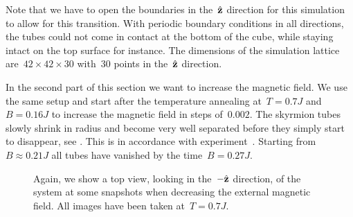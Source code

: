 Note that we have to open the boundaries in the~$\hat{\mathbf{z}}$ direction for this
simulation to allow for this transition. With periodic boundary conditions in
all directions, the tubes could not come in contact at the bottom of the cube,
while staying intact on the top surface for instance. The dimensions of the
simulation lattice are~$42 \times 42 \times 30$ with~$30$ points in the~$\hat{\mathbf{z}}$
direction.

In the second part of this section we want to increase the magnetic field. We
use the same setup and start after the temperature annealing at~$T = 0.7 J$
and~$B = 0.16 J$ to increase the magnetic field in steps of~$0.002$. The
skyrmion tubes slowly shrink in radius and become very well separated before
they simply start to disappear, see . This is in accordance
with experiment~. Starting from~$B \approx 0.21 J$ all tubes have
vanished by the time~$B = 0.27 J$.

\begin{figure}[H]
  \centering
  \caption{Again, we show a top view, \ie{} looking in the~$-\hat{\mathbf{z}}$ direction, of
  the system at some snapshots when decreasing the external magnetic field. All
  images have been taken at~$T= 0.7 J$.}
\label{fig:hedgehog}
\end{figure}

